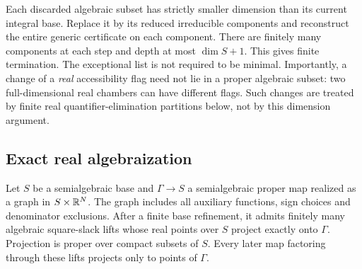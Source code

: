 Each discarded algebraic subset has strictly smaller dimension than its
current integral base. Replace it by its reduced irreducible components
and reconstruct the entire generic certificate on each component. There
are finitely many components at each step and depth at most $\dim S+1$.
This gives finite termination. The exceptional list is not required to be
minimal. Importantly, a change of a \emph{real} accessibility flag need
not lie in a proper algebraic subset: two full-dimensional real chambers
can have different flags. Such changes are treated by finite real
quantifier-elimination partitions below, not by this dimension argument.

\subsection{Exact real algebraization}
\begin{lemma}\label{lem:slack-exact}
Let $S$ be a semialgebraic base and $\Gamma\to S$ a semialgebraic proper
map realized as a graph in $S\times\mathbb R^N$. The graph includes all auxiliary
functions, sign choices and denominator exclusions. After a finite base
refinement, it admits finitely many algebraic square-slack lifts whose
real points over $S$ project exactly onto $\Gamma$. Projection is proper
over compact subsets of $S$. Every later map factoring through these
lifts projects only to points of $\Gamma$.
\end{lemma}
